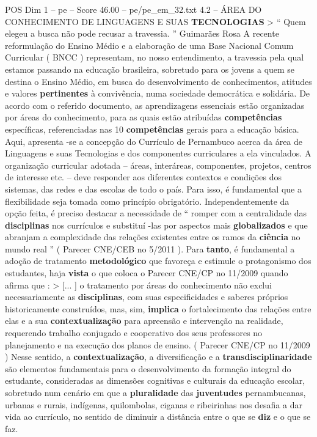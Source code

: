 \begin{textsample}{POS Dim 1 – pe – Score 46.00 – pe/pe\_em\_32.txt}  \label{ex:f1_pos_242}
4.2 – ÁREA DO CONHECIMENTO DE LINGUAGENS E SUAS \textbf{TECNOLOGIAS} > “ Quem elegeu a busca não pode recusar a travessia. ” Guimarães Rosa A recente reformulação do Ensino Médio e a elaboração de uma Base Nacional Comum Curricular ( BNCC ) representam, no nosso entendimento, a travessia pela qual estamos passando na educação brasileira, sobretudo para os jovens a quem se destina o Ensino Médio, em busca do desenvolvimento de conhecimentos, atitudes e valores \textbf{pertinentes} à convivência, numa sociedade democrática e solidária.
De acordo com o referido documento, as aprendizagens essenciais estão organizadas por áreas do conhecimento, para as quais estão atribuídas \textbf{competências} específicas, referenciadas nas 10 \textbf{competências} gerais para a educação básica.
Aqui, apresenta -se a concepção do Currículo de Pernambuco acerca da área de Linguagens e suas Tecnologias e dos componentes curriculares a ela vinculados.
A organização curricular adotada – áreas, interáreas, componentes, projetos, centros de interesse etc. – deve responder aos diferentes contextos e condições dos sistemas, das redes e das escolas de todo o país.
Para isso, é fundamental que a flexibilidade seja tomada como princípio obrigatório.
Independentemente da opção feita, é preciso destacar a necessidade de “ romper com a centralidade das \textbf{disciplinas} nos currículos e substituí -las por aspectos mais \textbf{globalizados} e que abranjam a complexidade das relações existentes entre os ramos da \textbf{ciência} no mundo real ” ( Parecer CNE/CEB no 5/2011 ).
Para \textbf{tanto}, é fundamental a adoção de tratamento \textbf{metodológico} que favoreça e estimule o protagonismo dos estudantes, haja \textbf{vista} o que coloca o Parecer CNE/CP no 11/2009 quando afirma que : > [... ] o tratamento por áreas do conhecimento não exclui necessariamente as \textbf{disciplinas}, com suas especificidades e saberes próprios historicamente construídos, mas, sim, \textbf{implica} o fortalecimento das relações entre elas e a sua \textbf{contextualização} para apreensão e intervenção na realidade, requerendo trabalho conjugado e cooperativo dos seus professores no planejamento e na execução dos planos de ensino. ( Parecer CNE/CP no 11/2009 ) Nesse sentido, a \textbf{contextualização}, a diversificação e a \textbf{transdisciplinaridade} são elementos fundamentais para o desenvolvimento da formação integral do estudante, consideradas as dimensões cognitivas e culturais da educação escolar, sobretudo num cenário em que a \textbf{pluralidade} das \textbf{juventudes} pernambucanas, urbanas e rurais, indígenas, quilombolas, ciganas e ribeirinhas nos desafia a dar vida ao currículo, no sentido de diminuir a distância entre o que se \textbf{diz} e o que se faz.

\end{textsample}
